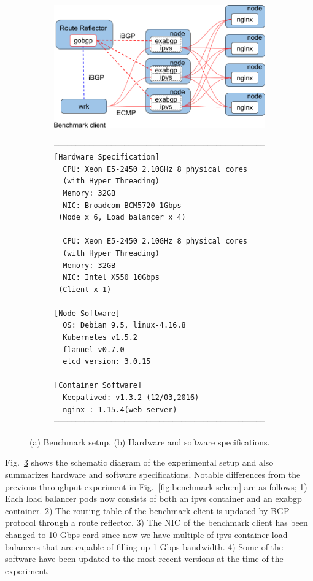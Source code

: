 \begin{figure}[h]

\begin{subfigure}[b]{\columnwidth}
    \includegraphics[width=0.9\columnwidth]{Figs/lb_ecmp_schem}
    \caption{}
    \label{fig:lb_ecmp_schem}
\end{subfigure}

  \begin{subfigure}[t]{\columnwidth}
\begin{Verbatim}[commandchars=\\\{\}]
───────────────────────────────────────────────────────
[Hardware Specification]
  CPU: Xeon E5-2450 2.10GHz 8 physical cores
  (with Hyper Threading) 
  Memory: 32GB
  NIC: Broadcom BCM5720 1Gbps
 (Node x 6, Load balancer x 4)

  CPU: Xeon E5-2450 2.10GHz 8 physical cores
  (with Hyper Threading) 
  Memory: 32GB
  NIC: Intel X550 10Gbps
 (Client x 1)
  
[Node Software]
  OS: Debian 9.5, linux-4.16.8
  Kubernetes v1.5.2
  flannel v0.7.0
  etcd version: 3.0.15

[Container Software]
  Keepalived: v1.3.2 (12/03,2016)
  nginx : 1.15.4(web server) 
───────────────────────────────────────────────────────
\end{Verbatim}
    \caption{}
    \label{fig:ecmp-hw_sw_spec}
  \end{subfigure}

  \caption{
    (a) Benchmark setup. (b) Hardware and software specifications.
  }
  \label{fig:ecmp-benchmark-schem}
\end{figure}

Fig.~\ref{fig:ecmp-benchmark-schem} shows the schematic diagram of the experimental setup and also summarizes hardware and software specifications.
Notable differences from the previous throughput experiment in Fig.~\ref{fig:benchmark-schem} are as follows;
1) Each load balancer pods now consists of both an ipvs container and an exabgp container.
2) The routing table of the benchmark client is updated by BGP protocol through a route reflector.
3) The NIC of the benchmark client has been changed to 10 Gbps card since now we have multiple of ipvs container load balancers that are capable of filling up 1 Gbps bandwidth.
4) Some of the software have been updated to the most recent versions at the time of the experiment.

